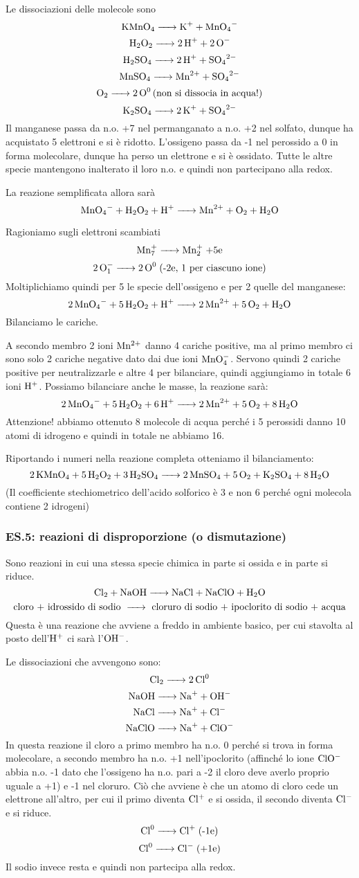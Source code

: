 Le dissociazioni delle molecole sono
$$\ce{KMnO_4 -> K+ + MnO_4-}$$
$$\ce{H_2O_2 -> 2H+ + 2O-}$$
$$\ce{H_2SO_4 -> 2H+ + SO_4^2-}$$
$$\ce{MnSO_4 -> Mn^2+ + SO_4^2-}$$
$$\ce{O_2 -> 2O^0 \text{(non si dissocia in acqua!)}}$$
$$\ce{K_2SO_4 -> 2K+ + SO_4^2-}$$
Il manganese passa da n.o. +7 nel permanganato a n.o. +2 nel solfato, dunque ha acquistato 5 elettroni e si è ridotto. L'ossigeno passa da -1 nel perossido a 0 in forma molecolare, dunque ha perso un elettrone e si è ossidato. Tutte le altre specie mantengono inalterato il loro n.o. e quindi non partecipano alla redox.

La reazione semplificata allora sarà
$$\ce{MnO_4- + H_2O_2 + H+ -> Mn^2+ + O_2 + H_2O}$$

Ragioniamo sugli elettroni scambiati
$$\ce{Mn^+7 -> Mn^+2} \; \text{+5e}$$
$$\ce{2O^-1 -> 2O^0} \; \text{(-2e, 1 per ciascuno ione)}$$
Moltiplichiamo quindi per 5 le specie dell'ossigeno e per 2 quelle del manganese:
$$\ce{2MnO_4- + 5H_2O_2 + H+ -> 2Mn^2+ + 5O_2 + H_2O}$$
Bilanciamo le cariche.

A secondo membro 2 ioni $\rm Mn^{2+}$ danno 4 cariche positive, ma al primo membro ci sono solo 2 cariche negative dato dai due ioni $\rm MnO_4^-$. Servono quindi 2 cariche positive per neutralizzarle e altre 4 per bilanciare, quindi aggiungiamo in totale 6 ioni $\rm H^+$. Possiamo bilanciare anche le masse, la reazione sarà:
$$\ce{2MnO_4- + 5H_2O_2 + 6H+ -> 2Mn^2+ + 5O_2 + 8H_2O}$$
Attenzione! abbiamo ottenuto 8 molecole di acqua perché i 5 perossidi danno 10 atomi di idrogeno e quindi in totale ne abbiamo 16.

Riportando i numeri nella reazione completa otteniamo il bilanciamento:
$$\ce{2KMnO_4 + 5H_2O_2 + 3H_2SO_4 -> 2MnSO_4 + 5O_2 + K_2SO_4 + 8H_2O}$$
(Il coefficiente stechiometrico dell'acido solforico è 3 e non 6 perché ogni molecola contiene 2 idrogeni)
\subsubsection{\textbf{ES.5: reazioni di disproporzione (o dismutazione)}}

Sono reazioni in cui una stessa specie chimica in parte si ossida e in parte si riduce.
$$\ce{Cl_2 + NaOH -> NaCl + NaClO + H_2O}$$
$$\text{cloro + idrossido di sodio \ce{->} cloruro di sodio + ipoclorito di sodio + acqua}$$
Questa è una reazione che avviene a freddo in ambiente basico, per cui stavolta al posto dell'$\rm H^+$ ci sarà l'$\rm OH^-$.

Le dissociazioni che avvengono sono:
$$\ce{Cl_2 -> 2Cl^0}$$
$$\ce{NaOH -> Na+ + OH-}$$
$$\ce{NaCl -> Na+ + Cl-}$$
$$\ce{NaClO -> Na+ + ClO-}$$
In questa reazione il cloro a primo membro ha n.o. 0 perché si trova in forma molecolare, a secondo membro ha n.o. +1 nell'ipoclorito (affinché lo ione $\rm ClO^-$ abbia n.o. -1 dato che l'ossigeno ha n.o. pari a -2 il cloro deve averlo proprio uguale a +1) e -1 nel cloruro. Ciò che avviene è che un atomo di cloro cede un elettrone all'altro, per cui il primo diventa $\rm Cl^+$ e si ossida, il secondo diventa $\rm Cl^-$ e si riduce.
$$\ce{Cl^0 -> Cl+} \; \text{(-1e)}$$
$$\ce{Cl^0 ->Cl-} \; \text{(+1e)}$$
Il sodio invece resta  e quindi non partecipa alla redox.

